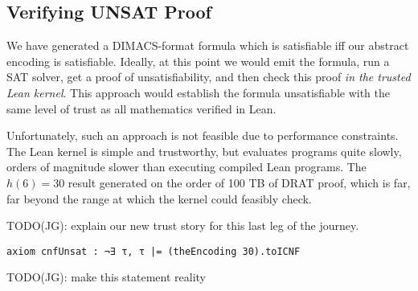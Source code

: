 \subsection{Verifying UNSAT Proof}

We have generated a DIMACS-format formula which is satisfiable iff
our abstract encoding is satisfiable.
Ideally, at this point we would emit the formula,
run a SAT solver,
get a proof of unsatisfiability,
and then check this proof \textit{in the trusted Lean kernel}.
This approach would establish the formula unsatisfiable
with the same level of trust as all mathematics verified in Lean.

Unfortunately, such an approach is not feasible due to performance constraints.
The Lean kernel is simple and trustworthy,
but evaluates programs quite slowly,
orders of magnitude slower than executing compiled Lean programs.
The \(h(6) = 30\) result generated on the order of 100 TB of DRAT proof,
which is far, far beyond the range at which the kernel could feasibly check.

TODO(JG): explain our new trust story for this last leg of the journey.

\begin{lstlisting}
axiom cnfUnsat : ¬∃ τ, τ |= (theEncoding 30).toICNF
\end{lstlisting}
TODO(JG): make this statement reality
